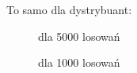 \documentclass{article}
\begin{document}
\begin{enumerate}
		To samo dla dystrybuant:
		\begin{figure}[h]
			\begin{center}
				\caption{dla 5000 losowań}
			\end{center}
		\end{figure} 
		
		\begin{figure}[h]
			\begin{center}
				\caption{dla 1000 losowań}
			\end{center}
		\end{figure} 
	

\end{enumerate}
\end{document}
